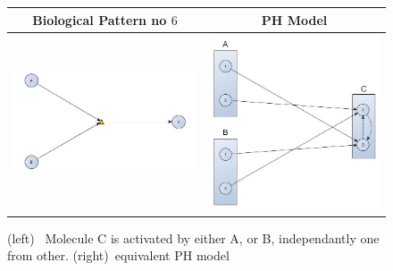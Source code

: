 \documentclass[11pt,a4paper,twoside]{epig}
\begin{document}
\begin{figure}[ht]
\begin{tabular}{|c|c|}
\hline
Biological Pattern no $6$ & PH Model \\
\hline
 \includegraphics[scale=0.25]{./imagesannexe/phdrawings/6cyt.jpg} & \includegraphics[scale=0.15]{./imagesannexe/phdrawings/6ph.jpg} \\
 \hline
\end{tabular}
\caption{\label{fig:pattern:6}
(left)~ Molecule C is activated by either A, or B, independantly one from other.
(right)~equivalent PH model
}
\end{figure}
\end{document}
